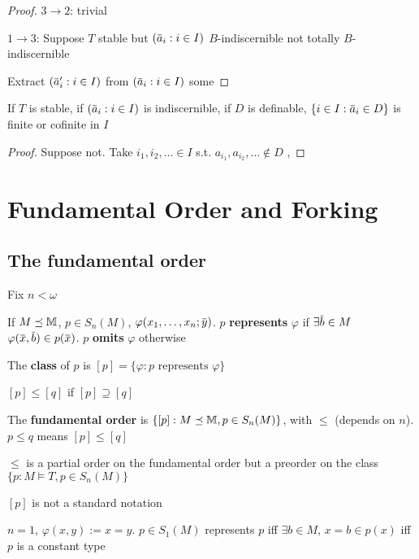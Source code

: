 \documentclass[11pt]{article}
\begin{document}
\begin{proof}
\(3\to 2\): trivial

\(1\to 3\): Suppose \(T\) stable but \((\bara_i:i\in I)\) \(B\)-indiscernible not
totally \(B\)-indiscernible

Extract \((\bara_i':i\in I)\) from \((\bara_i:i\in I)\) some
\end{proof}

\begin{corollary}[]
If \(T\) is stable, if \((\bara_i:i\in I)\) is indiscernible, if \(D\) is
definable, \(\{i\in I:\bara_i\in D\}\) is finite or cofinite in \(I\)
\end{corollary}

\begin{proof}
Suppose not. Take \(i_1,i_2,\dots\in I\) s.t. \(a_{i_1},a_{i_2},\dots\notin D\) , 
\end{proof}


\section{Fundamental Order and Forking}
\label{sec:org0964c66}
\subsection{The fundamental order}
\label{sec:orgbc20852}
Fix \(n<\omega\)
\begin{definition}[]
If \(M\preceq\mathbb{M}\), \(p\in S_n(M)\), \(\varphi(x_1,\dots,x_n;\bary)\). \(p\) \textbf{represents} \(\varphi\)
if \(\exists\barb\in M\) \(\varphi(\barx,\barb)\in p(\barx)\). \(p\) \textbf{omits} \(\varphi\) otherwise

The \textbf{class} of \(p\) is \([p]=\{\varphi:p\text{ represents }\varphi\}\)

\([p]\le[q]\) if \([p]\supseteq[q]\)

The \textbf{fundamental order} is \(\{[p]:M\preceq\mathbb{M},p\in S_n(M)\}\), with \(\le\) (depends on \(n\)). \(p\le q\) means \([p]\le[q]\)
\end{definition}

\begin{remark}
\(\le\) is a partial order on the fundamental order but a preorder on the class \(\{p:M\vDash T,p\in S_n(M)\}\)
\end{remark}

\([p]\) is not a standard notation

\begin{examplle}[]
\(n=1\), \(\varphi(x,y):=x=y\). \(p\in S_1(M)\) represents \(p\) iff \(\exists b\in M\), \(x=b\in p(x)\) iff \(p\)
is a constant type
\end{examplle}
\end{document}
